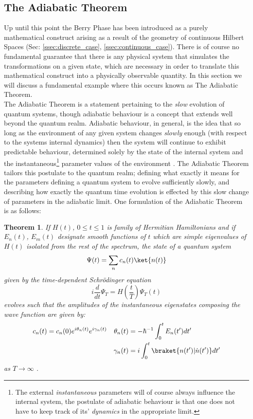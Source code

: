 \documentclass{article}
\newtheorem{thm}{Theorem}
\begin{document}
\subsection{The Adiabatic Theorem}\label{ssec:adiabatic_theorem}

Up until this point the Berry Phase has been introduced as a purely mathematical construct arising as a result of the geometry of continuous Hilbert Spaces (Sec: \ref{ssec:discrete_case}, \ref{ssec:continuous_case}). There is of course no fundamental guarantee that there is any physical system that simulates the transformations on a given state, which are necessary in order to translate this mathematical construct into a physically observable quantity. In this section we will discuss a fundamental example where this occurs known as The Adiabatic Theorem.\\

The Adiabatic Theorem is a statement pertaining to the \textit{slow} evolution of quantum systems, though adiabatic behaviour is a concept that extends well beyond the quantum realm. Adiabatic behaviour, in general, is the idea that so long as the environment of any given system changes \textit{slowly} enough (with respect to the systems internal dynamics) then the system will continue to exhibit predictable behaviour, determined solely by the state of the internal system and the instantaneous\footnote{The external \textit{instantaneous} parameters will of course always influence the internal system, the postulate of adiabatic behaviour is that one does not have to keep track of its' \textit{dynamics} in the appropriate limit.} parameter values of the environment \cite{Griffiths2017}. The Adiabatic Theorem tailors this postulate to the quantum realm; defining what exactly it means for the parameters defining a quantum system to evolve sufficiently slowly, and describing how exactly the quantum time evolution is effected by this slow change of parameters in the adiabatic limit. One formulation of the Adiabatic Theorem is as follows:\\

\begin{thm}
If $H(t)$, $0 \leq t \leq 1$ is  family of Hermitian Hamiltonians and if $E_n(t)$, $E_m(t)$ designate smooth functions of $t$ which are simple eigenvalues of $H(t)$ isolated from the rest of the spectrum, the state of a quantum system \[\Psi(t) = \sum_{n} c_{n}(t)\ket{n(t)}\] given by the time-dependent Schrödinger equation
  \[i\frac{d}{dt}\Psi_{T} = H(\frac{t}{T})\Psi_{T}(t)\]
evolves such that the amplitudes of the instantaneous eigenstates composing the wave function are given by:
    \begin{align*} 
        c_{n}(t) = c_{n}(0)e^{i\theta_{n}(t)}e^{i\gamma_{n}(t)} &&
        \theta_{n}(t)  &= -\hbar^{-1} \int_{0}^{t} E_{n}(t^{\prime}) dt^{\prime}\\  
        && \gamma_{n}(t) &= i\int_{0}^{t} \braket{n(t^{\prime})|\dot{n}(t^{\prime})}
        dt^{\prime}
    \end{align*}
as $T \to \infty$ \cite{Born1928, Berry1984, Simon1983, Sakurai1994}.
\end{thm}
\end{document}
